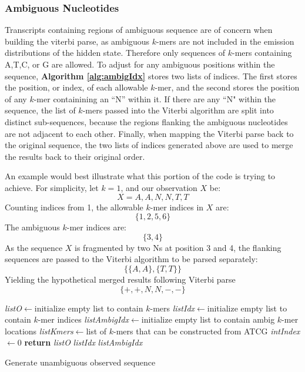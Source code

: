 \subsubsection{Ambiguous Nucleotides}
Transcripts containing regions of ambiguous sequence are of concern when building the viterbi parse, as ambiguous $k$-mers are not included in the emission distributions of the hidden state. Therefore only sequences of $k$-mers containing A,T,C, or G are allowed. To adjust for any ambiguous positions within the sequence, \textbf{Algorithm \ref{alg:ambigIdx}} stores two lists of indices. The first stores the position, or index, of each allowable $k$-mer, and the second stores the position of any $k$-mer containining an ``N'' within it. If there are any ``N" within the sequence, the list of $k$-mers passed into the Viterbi algorithm are split into distinct sub-sequences, because the regions flanking the ambiguous nucleotides are not adjacent to each other. Finally, when mapping the Viterbi parse back to the original sequence, the two lists of indices generated above are used to merge the results back to their original order.

An example would best illustrate what this portion of the code is trying to achieve. For simplicity, let $k=1$, and our observation $X$ be: 
$$X= A,A,N,N,T,T$$
Counting indices from 1, the allowable $k$-mer indices in $X$ are:
$$\{1,2,5,6\}$$
The ambiguous $k$-mer indices are:
$$\{3,4\}$$
As the sequence $X$ is fragmented by two Ns at position 3 and 4, the flanking sequences are passed to the Viterbi algorithm to be parsed separately:
$$\{\{A,A\},\{T,T\}\}$$
Yielding the hypothetical merged results following Viterbi parse
$$\{+,+,N,N,-,-\}$$
\begin{algorithm}[h]
\DontPrintSemicolon
{}
\SetAlgoLined
{}
\emph{listO}$\leftarrow$initialize empty list to contain $k$-mers\;
\emph{listIdx}$\leftarrow$initialize empty list to contain $k$-mer indices\;
\emph{listAmbigIdx}$\leftarrow$initialize empty list to contain ambig $k$-mer locations\;
\emph{listKmers}$\leftarrow$list of $k$-mers that can be constructed from ATCG\;
\emph{intIndex}$\leftarrow$0\;
 \textbf{return} \emph{listO} \emph{listIdx} \emph{listAmbigIdx}\;
 \caption{Generate unambiguous observed sequence}
 \label{alg:ambigIdx}
\end{algorithm}

